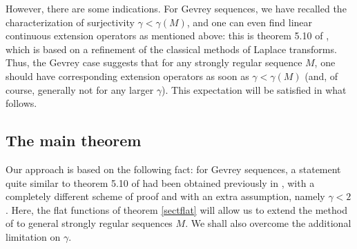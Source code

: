 \documentclass[a4paper]{amsart}
\theoremstyle{plain}
\theoremstyle{definition}
\theoremstyle{remark}
\begin{document}
However, there are some indications.
For Gevrey sequences, we have recalled the characterization of
surjectivity $ \gamma<\gamma(M) $, and one can even find linear continuous extension operators as mentioned above: this is theorem 5.10 of
\cite{SV}, which is based on a refinement of the classical methods of Laplace transforms. 
Thus, the Gevrey case suggests that for any strongly regular sequence $ M $, one should have corresponding extension operators
as soon as $ \gamma<\gamma(M) $ (and, of course, generally not for any larger $ \gamma $).
This expectation will be satisfied in what follows.

\subsection{The main theorem}\label{myext}

Our approach is based on the following fact: for Gevrey sequences,
a statement quite similar to theorem 5.10 of \cite{SV} had been obtained previously in \cite{VT1}, with a completely different scheme of proof and with an extra assumption, namely $ \gamma<2 $. Here, the flat functions of theorem \ref{sectflat} will allow us to extend the method of \cite{VT1} to general strongly regular sequences $ M $. We shall also overcome the additional limitation on $ \gamma $.
 
\end{document}

